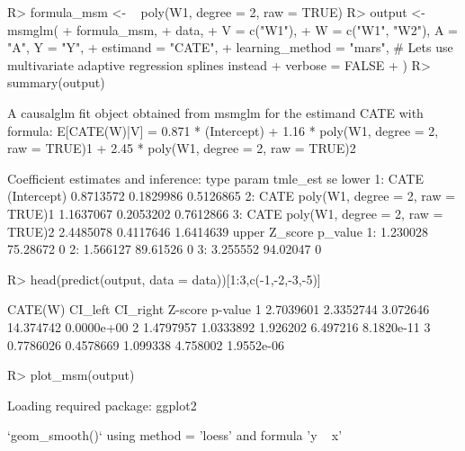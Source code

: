 \documentclass[
]{jss}
\begin{document}
\begin{CodeChunk}
\begin{CodeInput}
R> formula_msm <- ~ poly(W1, degree = 2, raw = TRUE)  
R> output <- msmglm(
+       formula_msm, 
+       data,
+       V = c("W1"),
+       W = c("W1", "W2"), A = "A", Y = "Y",
+       estimand = "CATE", 
+       learning_method = "mars", # Lets use multivariate adaptive regression splines instead
+       verbose = FALSE
+       )
R> summary(output)
\end{CodeInput}
\begin{CodeOutput}
A causalglm fit object obtained from msmglm for the estimand CATE with formula: 
E[CATE(W)|V] = 0.871 * (Intercept) + 1.16 * poly(W1, degree = 2, raw = TRUE)1 + 2.45 * poly(W1, degree = 2, raw = TRUE)2

Coefficient estimates and inference:
   type                             param  tmle_est        se     lower
1: CATE                       (Intercept) 0.8713572 0.1829986 0.5126865
2: CATE poly(W1, degree = 2, raw = TRUE)1 1.1637067 0.2053202 0.7612866
3: CATE poly(W1, degree = 2, raw = TRUE)2 2.4485078 0.4117646 1.6414639
      upper  Z_score p_value
1: 1.230028 75.28672       0
2: 1.566127 89.61526       0
3: 3.255552 94.02047       0
\end{CodeOutput}
\begin{CodeInput}
R> head(predict(output, data = data))[1:3,c(-1,-2,-3,-5)]
\end{CodeInput}
\begin{CodeOutput}
    CATE(W)   CI_left CI_right   Z-score    p-value
1 2.7039601 2.3352744 3.072646 14.374742 0.0000e+00
2 1.4797957 1.0333892 1.926202  6.497216 8.1820e-11
3 0.7786026 0.4578669 1.099338  4.758002 1.9552e-06
\end{CodeOutput}
\begin{CodeInput}
R> plot_msm(output)
\end{CodeInput}
\begin{CodeOutput}
Loading required package: ggplot2
\end{CodeOutput}
\begin{CodeOutput}
`geom_smooth()` using method = 'loess' and formula 'y ~ x'
\end{CodeOutput}



\end{CodeChunk}
\end{document}
